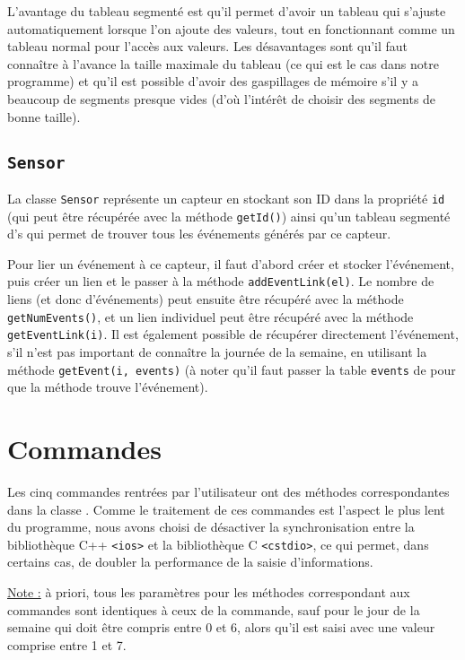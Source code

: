 \documentclass[11pt,a4paper]{article}
\begin{document}
L'avantage du tableau segmenté est qu'il permet d'avoir un tableau qui s'ajuste automatiquement lorsque l'on ajoute des valeurs, tout en fonctionnant comme un tableau normal pour l'accès aux valeurs. Les désavantages sont qu'il faut connaître à l'avance la taille maximale du tableau (ce qui est le cas dans notre programme) et qu'il est possible d'avoir des gaspillages de mémoire s'il y a beaucoup de segments presque vides (d'où l'intérêt de choisir des segments de bonne taille).

\subsection{\texttt{Sensor}}

La classe \texttt{Sensor} représente un capteur en stockant son ID dans la propriété \texttt{id} (qui peut être récupérée avec la méthode \texttt{getId()}) ainsi qu'un tableau segmenté d's qui permet de trouver tous les événements générés par ce capteur.

Pour lier un événement à ce capteur, il faut d'abord créer et stocker l'événement, puis créer un lien et le passer à la méthode \texttt{addEventLink(el)}. Le nombre de liens (et donc d'événements) peut ensuite être récupéré avec la méthode \texttt{getNumEvents()}, et un lien individuel peut être récupéré avec la méthode \texttt{getEventLink(i)}. Il est également possible de récupérer directement l'événement, s'il n'est pas important de connaître la journée de la semaine, en utilisant la méthode \texttt{getEvent(i, events)} (à noter qu'il faut passer la table \texttt{events} de  pour que la méthode trouve l'événement).

\section{Commandes}

Les cinq commandes rentrées par l'utilisateur ont des méthodes correspondantes dans la classe . Comme le traitement de ces commandes est l'aspect le plus lent du programme, nous avons choisi de désactiver la synchronisation entre la bibliothèque C++ \texttt{<ios>} et la bibliothèque C \texttt{<cstdio>}, ce qui permet, dans certains cas, de doubler la performance de la saisie d'informations.

\underline{Note :} à priori, tous les paramètres pour les méthodes correspondant aux commandes sont identiques à ceux de la commande, sauf pour le jour de la semaine qui doit être compris entre 0 et 6, alors qu'il est saisi avec une valeur comprise entre 1 et 7.
\end{document}
